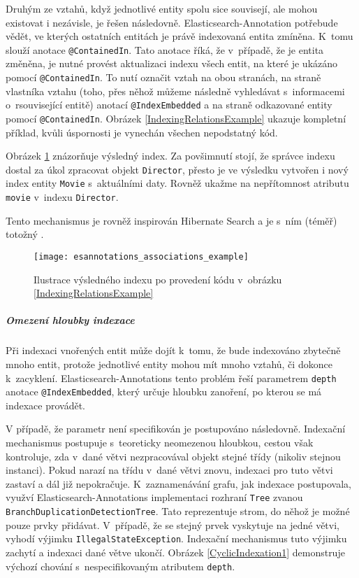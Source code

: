 \documentclass[11pt,oneside]{fithesis2}
\begin{document}
Druhým ze vztahů, když jednotlivé entity spolu sice souvisejí, ale mohou existovat i nezávisle, je řešen následovně. Elasticsearch-Annotation potřebude vědět, ve kterých ostatních entitách je právě indexovaná entita zmíněna. K~tomu slouží anotace \texttt{@ContainedIn}. Tato anotace říká, že v~případě, že je entita změněna, je nutné provést aktualizaci indexu všech entit, na které je ukázáno pomocí \texttt{@ContainedIn}. To nutí označit vztah na obou stranách, na straně vlastníka vztahu (toho, přes něhož můžeme následně vyhledávat s~informacemi o~rsouvisející entitě) anotací \texttt{@IndexEmbedded} a na straně odkazované entity pomocí \texttt{@ContainedIn}. Obrázek \ref{IndexingRelationsExample} ukazuje kompletní příklad, kvůli úspornosti je vynechán všechen nepodstatný kód.

Obrázek \ref{IndexingRelationsExampleResult} znázorňuje výsledný index. Za povšimnutí stojí, že správce indexu dostal za úkol zpracovat objekt \texttt{Director}, přesto je ve výsledku vytvořen i nový index entity \texttt{Movie} s~aktuálními daty. Rovněž ukažme na nepřítomnost atributu \texttt{movie} v~indexu \texttt{Director}. 

Tento mechanismus je rovněž inspirován Hibernate Search a je s~ním (téměř) totožný \cite[str. 110]{HibernateSearchAction}. 

\begin{figure}[t]
	\begin{center}
		\texttt{[image: esannotations\_associations\_example]}
	\end{center}
	\caption{Ilustrace výsledného indexu po provedení kódu v~obrázku \ref{IndexingRelationsExample}}	
	\label{IndexingRelationsExampleResult}
\end{figure}

\subparagraph{Omezení hloubky indexace} Při indexaci vnořených entit může dojít k~tomu, že bude indexováno zbytečně mnoho entit, protože jednotlivé entity mohou mít mnoho vztahů, či dokonce k~zacyklení. Elasticsearch-Annotations tento problém řeší parametrem \texttt{depth} anotace \texttt{@IndexEmbedded}, který určuje hloubku zanoření, po kterou se má indexace provádět. 

V případě, že parametr není specifikován je postupováno následovně. Indexační mechanismus postupuje s~teoreticky neomezenou hloubkou, cestou však kontroluje, zda v~dané větvi nezpracovával objekt stejné třídy (nikoliv stejnou instanci). Pokud narazí na třídu v~dané větvi znovu, indexaci pro tuto větvi zastaví a dál již nepokračuje. K~zaznamenávání grafu, jak indexace postupovala, využví Elasticsearch-Annotations implementaci rozhraní \texttt{Tree} zvanou \texttt{BranchDuplicationDetectionTree}. Tato reprezentuje strom, do něhož je možné pouze prvky přidávat. V~případě, že se stejný prvek vyskytuje na jedné větvi, vyhodí výjimku \texttt{IllegalStateException}. Indexační mechanismus tuto výjimku zachytí a indexaci dané větve ukončí. Obrázek \ref{CyclicIndexation1} demonstruje výchozí chování s~nespecifikovaným atributem \texttt{depth}. 
\end{document}

